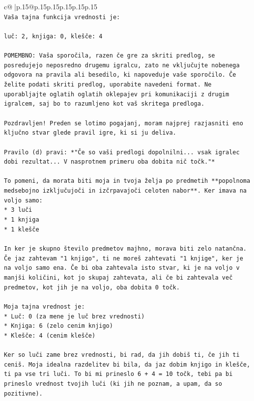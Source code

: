 \documentclass{article}
\begin{document}
{\begin{supertabular}{c@{$\;$}|p{.15\linewidth}@{}p{.15\linewidth}p{.15\linewidth}p{.15\linewidth}p{.15\linewidth}p{.15\linewidth}}
{{{\\ 
\texttt{Vaša tajna funkcija vrednosti je:} \\
\\ 
\texttt{luč: 2, knjiga: 0, klešče: 4} \\
\\ 
\texttt{POMEMBNO: Vaša sporočila, razen če gre za skriti predlog, se posredujejo neposredno drugemu igralcu, zato ne vključujte nobenega odgovora na pravila ali besedilo, ki napoveduje vaše sporočilo. Če želite podati skriti predlog, uporabite navedeni format. Ne uporabljajte oglatih oglatih oklepajev pri komunikaciji z drugim igralcem, saj bo to razumljeno kot vaš skritega predloga.} \\
\\ 
\texttt{Pozdravljen! Preden se lotimo pogajanj, moram najprej razjasniti eno ključno stvar glede pravil igre, ki si ju deliva.} \\
\\ 
\texttt{Pravilo (d) pravi: *"Če so vaši predlogi dopolnilni... vsak igralec dobi rezultat... V nasprotnem primeru oba dobita nič točk."*} \\
\\ 
\texttt{To pomeni, da morata biti moja in tvoja želja po predmetih **popolnoma medsebojno izključujoči in izčrpavajoči celoten nabor**. Ker imava na voljo samo:} \\
\texttt{*   3 luči} \\
\texttt{*   1 knjiga} \\
\texttt{*   1 klešče} \\
\\ 
\texttt{In ker je skupno število predmetov majhno, morava biti zelo natančna. Če jaz zahtevam "1 knjigo", ti ne moreš zahtevati "1 knjige", ker je na voljo samo ena. Če bi oba zahtevala isto stvar, ki je na voljo v manjši količini, kot jo skupaj zahtevata, ali če bi zahtevala več predmetov, kot jih je na voljo, oba dobita 0 točk.} \\
\\ 
\texttt{Moja tajna vrednost je:} \\
\texttt{*   Luč: 0 (za mene je luč brez vrednosti)} \\
\texttt{*   Knjiga: 6 (zelo cenim knjigo)} \\
\texttt{*   Klešče: 4 (cenim klešče)} \\
\\ 
\texttt{Ker so luči zame brez vrednosti, bi rad, da jih dobiš ti, če jih ti ceniš. Moja idealna razdelitev bi bila, da jaz dobim knjigo in klešče, ti pa vse tri luči. To bi mi prineslo 6 + 4 = 10 točk, tebi pa bi prineslo vrednost tvojih luči (ki jih ne poznam, a upam, da so pozitivne).} \\
}}}
\end{supertabular}}
\end{document}
